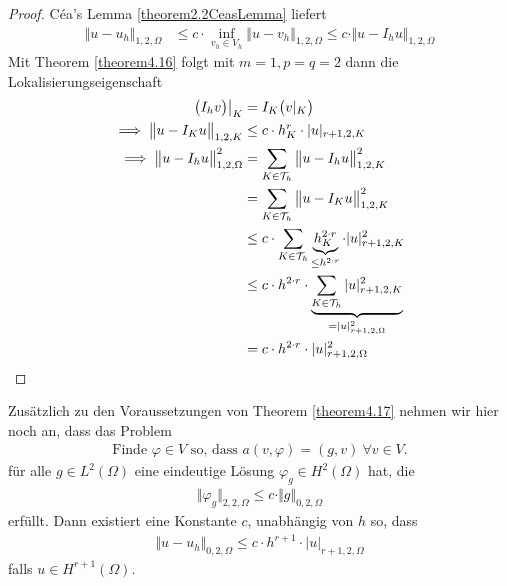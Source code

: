 \begin{proof}
	Céa's Lemma \ref{theorem2.2CeasLemma} liefert
	\begin{align*}
		\Vert u-u_h\Vert_{1,2,\Omega}&\leq c\cdot \inf\limits_{v_h\in V_h}\Vert u-v_h\Vert_{1,2,\Omega}
		\leq c\cdot\Vert u-I_h u\Vert_{1,2,\Omega}
	\end{align*}
	Mit Theorem \ref{theorem4.16} folgt mit $m=1,p=q=2$ dann die Lokalisierungseigenschaft
	\begin{align*}
		\big(I_h v\big)\big|_K&=I_K\big(v|_K\big)\\
		\implies
		\big\Vert u-I_K u\big\Vert_{1,2,K}&\leq c\cdot h_K^r\cdot|u|_{r+1,2,K}\\
		\implies
		\big\Vert u-I_h u\big\Vert^2_{1,2,\Omega}
		&=\sum\limits_{K\in\mathcal{T}_h}\big\Vert u-I_h u\big\Vert^2_{1,2,K}\\
		&=\sum\limits_{K\in\mathcal{T}_h}\big\Vert u-I_K u\big\Vert^2_{1,2,K}\\
		&\leq
		c\cdot\sum\limits_{K\in\mathcal{T}_h}\underbrace{h_K^{2\cdot r}}_{\leq h^{2\cdot r}}\cdot|u|^2_{r+1,2,K}\\
		&\leq c\cdot h^{2\cdot r}\cdot\underbrace{\sum\limits_{K\in\mathcal{T}_h}|u|^2_{r+1,2,K}}_{=|u|^2_{r+1,2,\Omega}}\\
		&=c\cdot h^{2\cdot r}\cdot|u|^2_{r+1,2,\Omega}
	\end{align*}
\end{proof}

\begin{theorem}\label{theorem4.18}
	Zusätzlich zu den Voraussetzungen von Theorem \ref{theorem4.17} nehmen wir hier noch an, dass das Problem 
	\begin{align*}
		\text{Finde }\varphi\in V\text{ so, dass }a(v,\varphi)=(g,v)~\forall v\in V.
	\end{align*}
	für alle $g\in L^2(\Omega)$ eine eindeutige Lösung $\varphi_g\in H^2(\Omega)$ hat, die 
	\begin{align*}
		\Vert\varphi_g\Vert_{2,2,\Omega}\leq c\cdot\Vert g\Vert_{0,2,\Omega}
	\end{align*}
	erfüllt. Dann existiert eine Konstante $c$, unabhängig von $h$ so, dass
	\begin{align*}
		\Vert u-u_h\Vert_{0,2,\Omega}\leq c\cdot h^{r+1}\cdot|u|_{r+1,2,\Omega}
	\end{align*}
	falls $u\in H^{r+1}(\Omega)$.
\end{theorem}


